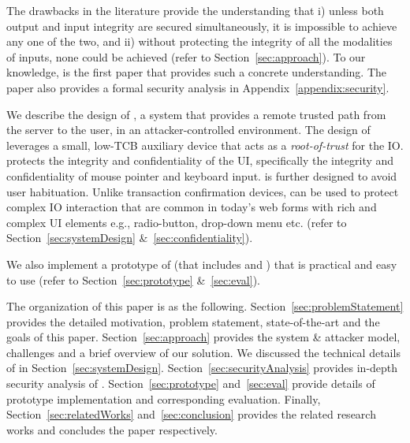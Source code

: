

\begin{mybullet}
  \item The drawbacks in the literature provide the understanding that i) unless both output and input integrity are secured simultaneously, it is impossible to achieve any one of the two, and ii) without protecting the integrity of all the modalities of inputs, none could be achieved (refer to Section~\ref{sec:approach}). To our knowledge, \name is the first paper that provides such a concrete understanding. The paper also provides a formal security analysis in Appendix~\ref{appendix:security}. 
  \item We describe the design of \name, a system that provides a remote trusted path from the server to the user, in an attacker-controlled environment. The design of \name leverages a small, low-TCB auxiliary device that acts as a \emph{root-of-trust} for the IO. \name protects the integrity and confidentiality of the UI, specifically the integrity and confidentiality of mouse pointer and keyboard input. \name is further designed to avoid user habituation. Unlike transaction confirmation devices, \name can be used to protect complex IO interaction that are common in today's web forms with rich and complex UI elements e.g., radio-button, drop-down menu etc. (refer to Section~\ref{sec:systemDesign} \&~\ref{sec:confidentiality}).
  \item We also implement a prototype of \name (that includes \device and \name \js) that is practical and easy to use (refer to Section~\ref{sec:prototype} \&~\ref{sec:eval}).
\end{mybullet}


 The organization of this paper is as the following. Section~\ref{sec:problemStatement} provides the detailed motivation, problem statement, state-of-the-art and the goals of this paper. Section~\ref{sec:approach} provides the system \& attacker model, challenges and a brief overview of our solution. We discussed the technical details of \name in Section~\ref{sec:systemDesign}. Section~\ref{sec:securityAnalysis} provides in-depth security analysis of \name. Section~\ref{sec:prototype} and~\ref{sec:eval} provide details of \name prototype implementation and corresponding evaluation. Finally, Section~\ref{sec:relatedWorks} and~\ref{sec:conclusion} provides the related research works and concludes the paper respectively.

 